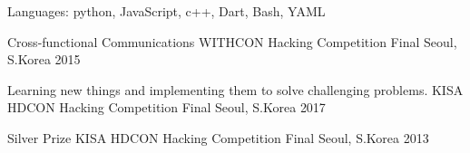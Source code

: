 



\begin{cvhonors}

  \cvhonor
    {Languages:} %
    {python, JavaScript, c++, Dart, Bash, YAML} %
    { } %
    {} %


\end{cvhonors}




\begin{cvhonors}

  \cvhonor
    {Cross-functional Communications} %
    {WITHCON Hacking Competition Final} %
    {Seoul, S.Korea} %
    {2015} %

  \cvhonor
    {Learning new things and implementing them to solve challenging problems.} %
    {KISA HDCON Hacking Competition Final} %
    {Seoul, S.Korea} %
    {2017} %

  \cvhonor
    {Silver Prize} %
    {KISA HDCON Hacking Competition Final} %
    {Seoul, S.Korea} %
    {2013} %

\end{cvhonors}
